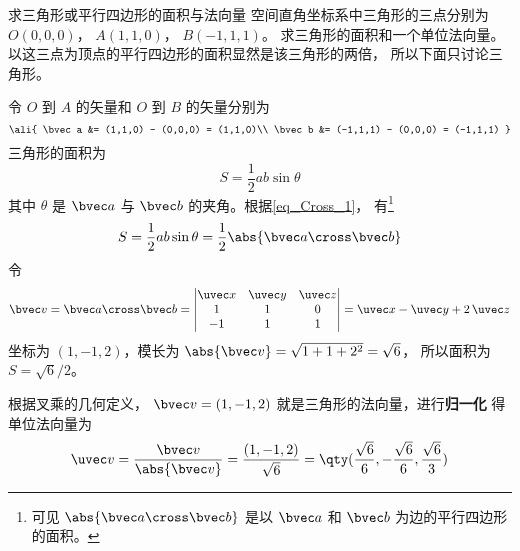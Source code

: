 \begin{example}{求三角形或平行四边形的面积与法向量}\label{ex_Cross_1}
空间直角坐标系中三角形的三点分别为 $O(0,0,0)$，  $A(1,1,0)$，  $B(-1,1,1)$。 求三角形的面积和一个单位法向量。 以这三点为顶点的平行四边形的面积显然是该三角形的两倍， 所以下面只讨论三角形。

令 $O$ 到 $A$ 的矢量和  $O$ 到 $B$ 的矢量分别为
\begin{equation}
\ali{
\bvec a  &= (1,1,0) - (0,0,0) = (1,1,0)\\
\bvec b  &= (-1,1,1) - (0,0,0) = (-1,1,1)
}\end{equation}
三角形的面积为
 \begin{equation}
S = \frac12 ab \sin \theta 
\end{equation}
其中 $\theta $ 是 $\bvec a$ 与 $\bvec b$ 的夹角。根据\autoref{eq_Cross_1}， 有\footnote{可见 $\abs{\bvec a\cross\bvec b}$ 是以 $\bvec a$ 和 $\bvec b$ 为边的平行四边形的面积。}
\begin{equation}
S = \frac12 ab \sin \theta  = \frac12 \abs{\bvec a\cross\bvec b}
\end{equation}
令
\begin{equation}
\bvec v = \bvec a \cross \bvec b = 
\begin{vmatrix} \uvec x & \uvec y & \uvec z \\ 1&1&0\\-1&1&1 \end{vmatrix}
= \uvec x - \uvec y + 2\,\uvec z 
\end{equation}
坐标为 $(1,-1,2)$，模长为 $\abs{\bvec v} = \sqrt{1 + 1 + 2^2} = \sqrt 6$， 所以面积为 $S = \sqrt 6 /2$。 

根据叉乘的几何定义， $\bvec v = (1,-1,2)$ 就是三角形的法向量，进行\textbf{归一化}
得单位法向量为
 \begin{equation}
\uvec v = \frac{\bvec v}{\abs{\bvec v}} = \frac{(1,-1,2)}{\sqrt 6} = \qty( \frac{\sqrt 6 }{6}, - \frac{\sqrt 6 }{6}, \frac{\sqrt 6 }{3} )
\end{equation}
\end{example}

